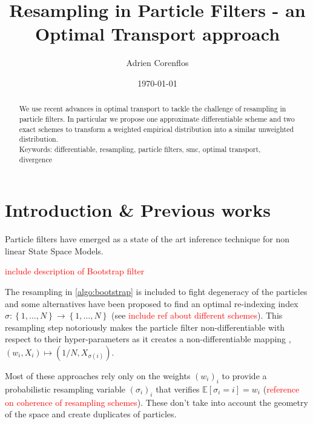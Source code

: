\documentclass[%
reprint,
amsmath,amssymb,
aps,
]{revtex4-2}
\newcommand\todo[1]{\textcolor{red}{#1}}
\begin{document}
	
	\title{Resampling in Particle Filters - an Optimal Transport approach}%
	
	\author{Adrien Corenflos} %
	\date{\today}%
	
	\begin{abstract}
		We use recent advances in optimal transport to tackle the challenge of resampling in particle filters. In particular we propose one approximate differentiable scheme and two exact schemes to transform a weighted empirical distribution into a similar unweighted distribution. 
		\\
		
		Keywords: differentiable, resampling, particle filters, smc, optimal transport, divergence
	\end{abstract}
	

	
	\maketitle
	
	\section{Introduction \& Previous works}
	
	Particle filters have emerged as a state of the art inference technique for non linear State Space Models.
	
	\todo{include description of Bootstrap filter}
	\label{algo:bootstrap}
	
	The resampling in \cref{algo:bootstrap} is included to fight degeneracy of the particles and some alternatives have been proposed to find an optimal re-indexing index $\sigma : \left\{ 1,\dots, N \right\} \to \left\{ 1,\dots, N \right\}$ (see \todo{include ref about different schemes}). This resampling step notoriously makes the particle filter non-differentiable with respect to their hyper-parameters as it creates a non-differentiable mapping , $(w_i, X_i) \mapsto (1/N, X_{\sigma(i)})$.

	Most of these approaches rely only on the weights $(w_i)_i$ to provide a probabilistic resampling variable $(\sigma_i)_i$ that verifies $\mathbb{E}[\sigma_i = i] = w_i$ (\todo{reference on coherence of resampling schemes}). These don't take into account the geometry of the space and create duplicates of particles.
	
\end{document}
